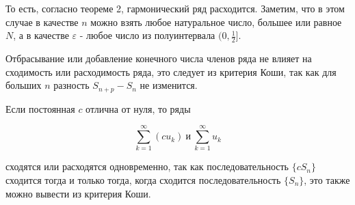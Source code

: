 То есть, согласно теореме 2, гармонический ряд расходится. Заметим, что в этом случае в качестве $n$ можно взять любое натуральное число, большее или равное $N$, а в качестве $\varepsilon$ - любое число из полуинтервала $(0, \frac{1}{2}]$.

\begin{note}
	Отбрасывание или добавление конечного числа членов ряда не влияет на сходимость или расходимость ряда, это следует из критерия Коши, так как для больших $n$ разность $S_{n + p} - S_n$ не изменится.
\end{note}

\begin{note}
	Если постоянная $c$ отлична от нуля, то ряды
	
	\begin{equation*}
		\displaystyle\sum_{k = 1}^\infty (cu_k) \ \mbox{и} \ \displaystyle\sum_{k = 1}^\infty u_k
	\end{equation*}
	
	сходятся или расходятся одновременно, так как последовательность $\{cS_n\}$ сходится тогда и только тогда, когда сходится последовательность $\{S_n\}$, это также можно вывести из критерия Коши.
\end{note}
